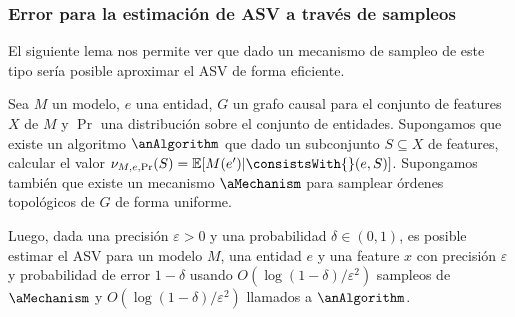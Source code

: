 \subsubsection{Error para la estimación de ASV a través de sampleos} \label{subsubSection:proofErrorSamplingASV}

El siguiente lema nos permite ver que dado un mecanismo de sampleo de este tipo sería posible aproximar el ASV de forma eficiente.

\begin{lemma}
    \label{theorem:asvSamplingError}

    Sea $M$ un modelo, $e$ una entidad, $G$ un grafo causal para el conjunto de features $X$ de $M$ y $\Pr$ una distribución sobre el conjunto de entidades. Supongamos que existe un algoritmo $\anAlgorithm$ que dado un subconjunto $S \subseteq X$ de features, calcular el valor $\nu_{M, e, \Pr}(S) =\mathbb{E}[M(e') | \consistsWith{}(e, S)]$. Supongamos también que existe un mecanismo $\aMechanism$ para samplear órdenes topológicos de $G$ de forma uniforme.

    Luego, dada una precisión $\varepsilon > 0$ y una probabilidad $\delta \in (0, 1)$, es posible estimar el ASV para un modelo $M$, una entidad $e$ y una feature $x$ con precisión $\varepsilon$ y probabilidad de error $1-\delta$ usando $O(\log(1-\delta)/\varepsilon^2)$ sampleos de $\aMechanism$ y $O(\log(1-\delta) / \varepsilon^2)$ llamados a $\anAlgorithm$.
    
\end{lemma}

